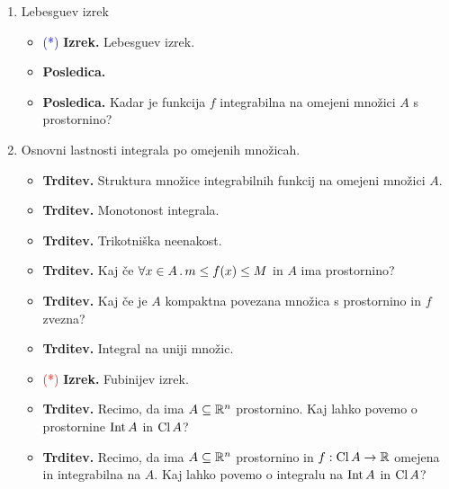 \begin{enumerate}
    \item Lebesguev izrek
    \begin{itemize}
        \item \textcolor{blue}{(*)} \textbf{Izrek.} Lebesguev izrek.
        \item \textbf{Posledica.} 
        \item \textbf{Posledica.} Kadar je funkcija \(f\) integrabilna na omejeni množici \(A\) s prostornino?
    \end{itemize}

    \item Osnovni lastnosti integrala po omejenih množicah.
    \begin{itemize}
        \item \textbf{Trditev.} Struktura množice integrabilnih funkcij na omejeni množici \(A\).
        \item \textbf{Trditev.} Monotonost integrala.
        \item \textbf{Trditev.} Trikotniška neenakost.
        \item \textbf{Trditev.} Kaj če \(\forall x \in A \,.\, m \leq f(x) \leq M\) in \(A\) ima prostornino?
        \item \textbf{Trditev.} Kaj če je \(A\) kompaktna povezana množica s prostornino in \(f\) zvezna?
        \item \textbf{Trditev.} Integral na uniji množic.
        \item \textcolor{red}{(*)} \textbf{Izrek.} Fubinijev izrek.
        \item \textbf{Trditev.} Recimo, da ima \(A \subseteq \mathbb{R}^n\) prostornino. Kaj lahko povemo o prostornine \(\operatorname{Int} A\) in \(\operatorname{Cl} A\)?
        \item \textbf{Trditev.} Recimo, da ima \(A \subseteq \mathbb{R}^n\) prostornino in \(f: \operatorname{Cl} A \to \mathbb{R}\) omejena in integrabilna na \(A\). Kaj lahko povemo o integralu na \(\operatorname{Int} A\) in \(\operatorname{Cl} A\)?
    \end{itemize}
\end{enumerate}